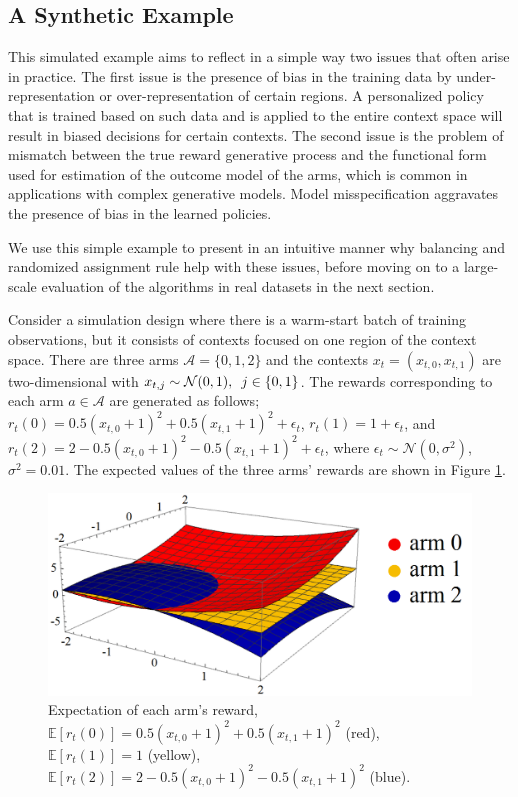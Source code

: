 \documentclass[letterpaper]{article} %
\def\A{\mathcal{A}}
\def\E{\mathbb{E}}
\begin{document}
\subsection{A Synthetic Example}\label{subsec:pedagogic}

This simulated example aims to reflect in a simple way two issues that often arise in practice.
The first issue is the presence of bias in the training data by under-representation or over-representation of certain regions. A personalized policy that is trained based on such data and is applied to the entire context space will result in biased decisions for certain contexts.  The second issue is the problem of mismatch between the true reward generative process and the functional form used for estimation of the outcome model of the arms, which is common in applications with complex generative models. Model misspecification aggravates the presence of bias in the learned policies.

We use this simple example to present in an intuitive manner why balancing and randomized assignment rule help with these issues, before moving on to a large-scale evaluation of the algorithms in real datasets in the next section.

Consider a simulation design where there is a warm-start batch of training observations, but it consists of contexts focused on one region of the context space. 
There are three arms $\A = \{0, 1, 2\}$ and the contexts $x_t = (x_{t,0}, x_{t,1})$ are two-dimensional with $x_{t,j} \sim \mathcal{N}(0, 1), \enskip j \in \{0, 1\}$. 
The rewards corresponding to each arm $a \in \A$ are generated as follows; $r_t(0) = 0.5 (x_{t,0} + 1)^2 + 0.5 (x_{t,1} + 1)^2 + \epsilon_t$, $r_t(1) = 1 + \epsilon_t$, and $r_t(2) = 2 - 0.5 (x_{t,0} + 1)^2 - 0.5 (x_{t,1} + 1)^2 +\epsilon_t$, where $\epsilon_t \sim \mathcal{N}(0, \sigma^2)$, $\sigma^2 = 0.01$. 
The expected values of the three arms' rewards are shown in Figure \ref{PotentialOutcomes}. 
\begin{figure}[!htb]
\centering
\includegraphics[width=0.5\columnwidth]{Figures/PotentialOutcomes.png}
\caption{Expectation of each arm's reward, $\E[r_t(0)] = 0.5 (x_{t,0} + 1)^2 + 0.5 (x_{t,1} + 1)^2$ (red), $\E[r_t(1)] = 1$ (yellow), $\E[r_t(2)] = 2 - 0.5 (x_{t,0} + 1)^2 - 0.5 (x_{t,1} + 1)^2$ (blue).}
\label{PotentialOutcomes}
\end{figure}
\end{document}
